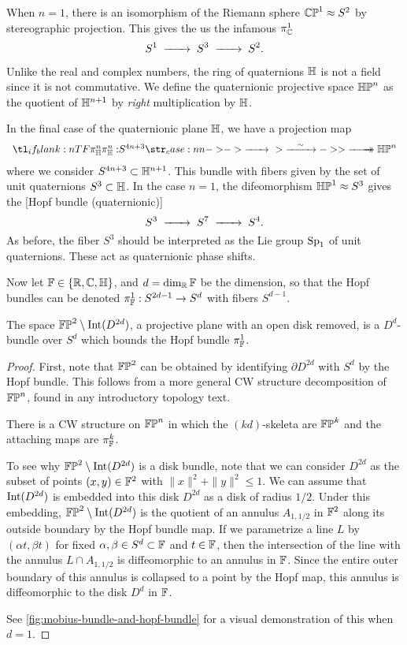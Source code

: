 When $n=1$, there is an isomorphism of the Riemann sphere $\mathbb{CP}^1\approx S^2$ by stereographic projection. This gives the us the infamous  $\pi_{\mathbb{C}}^1$
\[
	S^1 \lkxto S^3 \lkxto S^2.
\]

\begin{remark}
	Unlike the real and complex numbers, the ring of quaternions $\mathbb{H}$ is not a field since it is not commutative. We define the quaternionic projective space $\mathbb{HP}^{n}$ as the quotient of $\mathbb{H}^{n+1}$ by \emph{right} multiplication by $\mathbb{H}$.
\end{remark}

In the final case of the quaternionic plane $\mathbb{H}$, we have a projection map
\[
	\lkxfunc{\pi_\HH^n}{S^{4n+3}}{\HP^n}
\]
where we consider $S^{4n+3}\subset \mathbb{H}^{n+1}$. This bundle with fibers given by the set of unit quaternions $S^3\subset \mathbb{H}$.
In the case $n=1$, the difeomorphism $\mathbb{HP}^1\approx S^3$ gives the [Hopf bundle (quaternionic)]
\[
	S^3 \lkxto S^7 \lkxto S^4.
\]
As before, the fiber $S^3$ should be interpreted as the Lie group $\mathrm{Sp}_1$ of unit quaternions. These act as quaternionic phase shifts.

Now let $\mathbb{F}\in\{\mathbb{R}, \mathbb{C}, \mathbb{H}\}$, and $d=\dim_{\mathbb{R}} \mathbb{F}$ be the dimension, so that the Hopf bundles can be denoted $\pi_{\mathbb{F}}^1 : S^{2d-1} \to S^d$ with fibers $S^{d-1}$.

\begin{proposition}\label{prop:boundary-of-hopf-bundle}
	The space $\mathbb{FP}^2\setminus \operatorname{Int}(D^{2d})$, a projective plane with an open disk removed, is a $D^d$-bundle over $S^d$ which bounds the Hopf bundle $\pi_{\mathbb{F}}^1$.
\end{proposition}
\begin{proof}
	First, note that $\mathbb{FP}^2$ can be obtained by identifying $\partial D^{2d}$ with $S^d$ by the Hopf bundle. This follows from a more general CW structure decomposition of $\mathbb{FP}^n$, found in any introductory topology text.
	\begin{lemma}
		There is a CW structure on $\mathbb{FP}^n$ in which the $(kd)$-skeleta are $\mathbb{FP}^k$ and the attaching maps are $\pi_{\mathbb{F}}^k$.
	\end{lemma}

	To see why $\mathbb{FP}^2\setminus \operatorname{Int}(D^{2d})$ is a disk bundle, note that we can consider $D^{2d}$ as the subset of points $(x,y)\in \mathbb{F}^2$ with $\|x\|^2+\|y\|^2\leq 1$. We can assume that $\operatorname{Int}(D^{2d})$ is embedded into this disk $D^{2d}$ as a disk of radius $1/2$. Under this embedding, $\mathbb{FP}^2\setminus \operatorname{Int}(D^{2d})$ is the quotient of an annulus $A_{1,1/2}$ in $\mathbb{F}^2$ along its outside boundary by the Hopf bundle map.
	If we parametrize a line $L$ by $(\alpha t, \beta t)$ for fixed $\alpha,\beta\in S^d\subset \mathbb{F}$ and $t\in \mathbb{F}$, then the intersection of the line with the annulus $L\cap A_{1,1/2}$ is diffeomorphic to an annulus in $\mathbb{F}$. Since the entire outer boundary of this annulus is collapsed to a point by the Hopf map, this annulus is diffeomorphic to the disk $D^d$ in $\mathbb{F}$.

	See \cref{fig:mobius-bundle-and-hopf-bundle} for a visual demonstration of this when $d=1$.
\end{proof}

